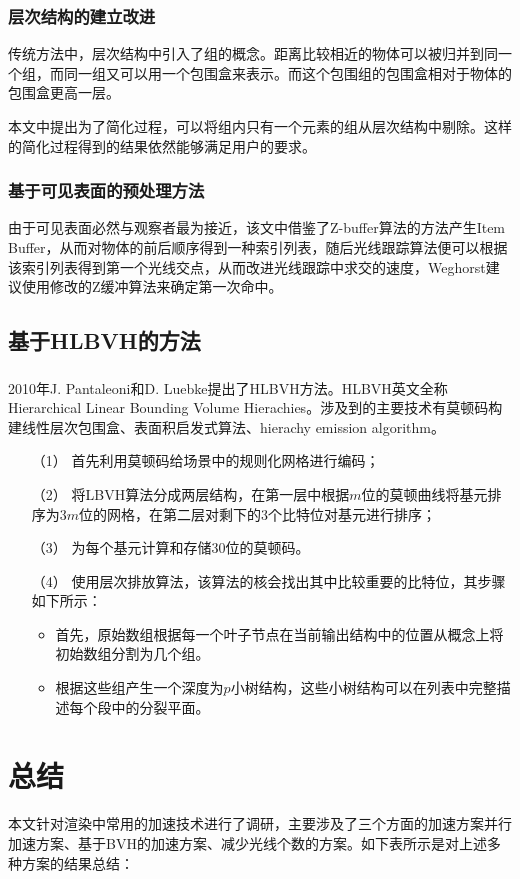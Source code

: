 \documentclass[11pt]{article}
\newcommand{\upcite}[1]{\textsuperscript{\textsuperscript{\cite{#1}}}}
\begin{document}
\subsubsection{层次结构的建立改进}
传统方法中，层次结构中引入了组的概念。距离比较相近的物体可以被归并到同一个组，而同一组又可以用一个包围盒来表示。而这个包围组的包围盒相对于物体的包围盒更高一层。
\par 本文中提出为了简化过程，可以将组内只有一个元素的组从层次结构中剔除。这样的简化过程得到的结果依然能够满足用户的要求。

\subsubsection{基于可见表面的预处理方法}
由于可见表面必然与观察者最为接近，该文中借鉴了Z-buffer算法的方法产生Item Buffer，从而对物体的前后顺序得到一种索引列表，随后光线跟踪算法便可以根据该索引列表得到第一个光线交点，从而改进光线跟踪中求交的速度，Weghorst建议使用修改的Z缓冲算法来确定第一次命中。

\subsection{基于HLBVH的方法}
2010年J. Pantaleoni和D. Luebke提出了HLBVH方法\upcite{HLBVH}。HLBVH英文全称Hierarchical Linear Bounding Volume Hierachies。涉及到的主要技术有莫顿码构建线性层次包围盒、表面积启发式算法、hierachy emission algorithm。

\begin{itemize}
\item[（1）]{首先利用莫顿码给场景中的规则化网格进行编码；}
\item[（2）]{将LBVH算法分成两层结构，在第一层中根据$m$位的莫顿曲线将基元排序为$3m$位的网格，在第二层对剩下的3个比特位对基元进行排序；}
\item[（3）]{为每个基元计算和存储30位的莫顿码。}
\item[（4）]{使用层次排放算法，该算法的核会找出其中比较重要的比特位，其步骤如下所示：}
\begin{itemize}
\item{首先，原始数组根据每一个叶子节点在当前输出结构中的位置从概念上将初始数组分割为几个组。}
\item{根据这些组产生一个深度为$p$小树结构，这些小树结构可以在列表中完整描述每个段中的分裂平面。}
\end{itemize}
\end{itemize}


\section{总结}
本文针对渲染中常用的加速技术进行了调研，主要涉及了三个方面的加速方案并行加速方案、基于BVH的加速方案、减少光线个数的方案。如下表所示是对上述多种方案的结果总结：
\end{document}

